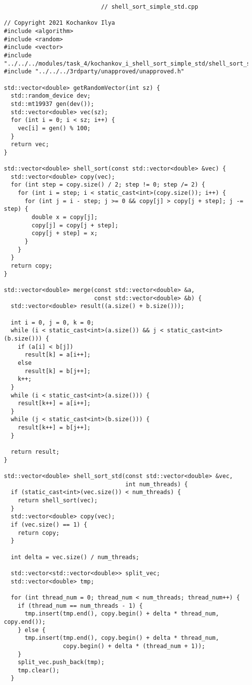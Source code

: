 \documentclass{report}
\begin{document}
\begin{lstlisting}
							// shell_sort_simple_std.cpp

// Copyright 2021 Kochankov Ilya
#include <algorithm>
#include <random>
#include <vector>
#include "../../../modules/task_4/kochankov_i_shell_sort_simple_std/shell_sort_simple_std.h"
#include "../../../3rdparty/unapproved/unapproved.h"

std::vector<double> getRandomVector(int sz) {
  std::random_device dev;
  std::mt19937 gen(dev());
  std::vector<double> vec(sz);
  for (int i = 0; i < sz; i++) {
    vec[i] = gen() % 100;
  }
  return vec;
}

std::vector<double> shell_sort(const std::vector<double> &vec) {
  std::vector<double> copy(vec);
  for (int step = copy.size() / 2; step != 0; step /= 2) {
    for (int i = step; i < static_cast<int>(copy.size()); i++) {
      for (int j = i - step; j >= 0 && copy[j] > copy[j + step]; j -= step) {
        double x = copy[j];
        copy[j] = copy[j + step];
        copy[j + step] = x;
      }
    }
  }
  return copy;
}

std::vector<double> merge(const std::vector<double> &a,
                          const std::vector<double> &b) {
  std::vector<double> result((a.size() + b.size()));

  int i = 0, j = 0, k = 0;
  while (i < static_cast<int>(a.size()) && j < static_cast<int>(b.size())) {
    if (a[i] < b[j])
      result[k] = a[i++];
    else
      result[k] = b[j++];
    k++;
  }
  while (i < static_cast<int>(a.size())) {
    result[k++] = a[i++];
  }
  while (j < static_cast<int>(b.size())) {
    result[k++] = b[j++];
  }

  return result;
}

std::vector<double> shell_sort_std(const std::vector<double> &vec,
                                   int num_threads) {
  if (static_cast<int>(vec.size()) < num_threads) {
    return shell_sort(vec);
  }
  std::vector<double> copy(vec);
  if (vec.size() == 1) {
    return copy;
  }

  int delta = vec.size() / num_threads;

  std::vector<std::vector<double>> split_vec;
  std::vector<double> tmp;

  for (int thread_num = 0; thread_num < num_threads; thread_num++) {
    if (thread_num == num_threads - 1) {
      tmp.insert(tmp.end(), copy.begin() + delta * thread_num, copy.end());
    } else {
      tmp.insert(tmp.end(), copy.begin() + delta * thread_num,
                 copy.begin() + delta * (thread_num + 1));
    }
    split_vec.push_back(tmp);
    tmp.clear();
  }


\end{lstlisting}
\end{document}
